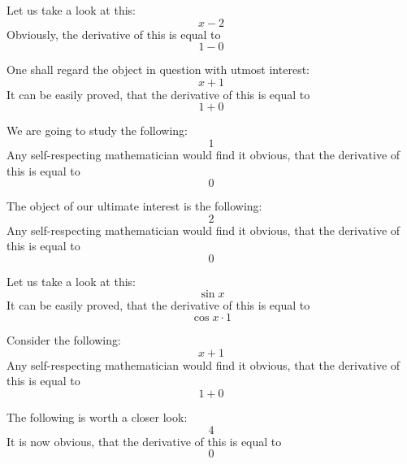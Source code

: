 \documentclass{article}
\begin{document}
Let us take a look at this:
\begin{equation}
x - 2 
\end{equation}
Obviously, the derivative of this is equal to
\begin{equation}
1 - 0 
\end{equation}

One shall regard the object in question with utmost interest:
\begin{equation}
x + 1 
\end{equation}
It can be easily proved, that the derivative of this is equal to
\begin{equation}
1 + 0 
\end{equation}

We are going to study the following:
\begin{equation}
1 
\end{equation}
Any self-respecting mathematician would find it obvious, that the derivative of this is equal to
\begin{equation}
0 
\end{equation}

The object of our ultimate interest is the following:
\begin{equation}
2 
\end{equation}
Any self-respecting mathematician would find it obvious, that the derivative of this is equal to
\begin{equation}
0 
\end{equation}

Let us take a look at this:
\begin{equation}
\sin x 
\end{equation}
It can be easily proved, that the derivative of this is equal to
\begin{equation}
\cos x \cdot 1 
\end{equation}

Consider the following:
\begin{equation}
x + 1 
\end{equation}
Any self-respecting mathematician would find it obvious, that the derivative of this is equal to
\begin{equation}
1 + 0 
\end{equation}

The following is worth a closer look:
\begin{equation}
4 
\end{equation}
It is now obvious, that the derivative of this is equal to
\begin{equation}
0 
\end{equation}
\end{document}

